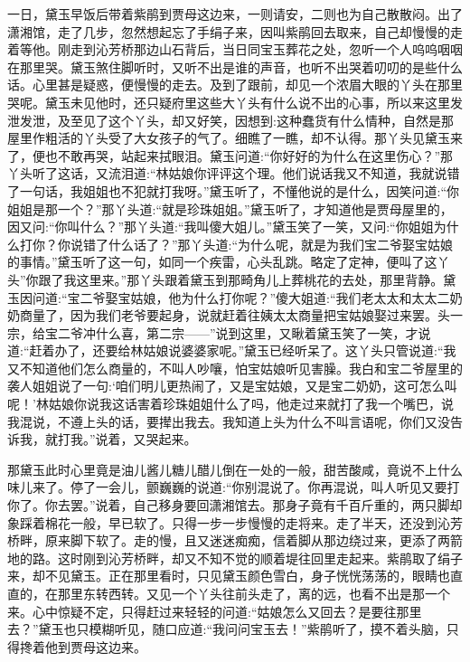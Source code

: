 \begin{parag}
    一日，黛玉早饭后带着紫鹃到贾母这边来，一则请安，二则也为自己散散闷。出了潇湘馆，走了几步，忽然想起忘了手绢子来，因叫紫鹃回去取来，自己却慢慢的走着等他。刚走到沁芳桥那边山石背后，当日同宝玉葬花之处，忽听一个人呜呜咽咽在那里哭。黛玉煞住脚听时，又听不出是谁的声音，也听不出哭着叨叨的是些什么话。心里甚是疑惑，便慢慢的走去。及到了跟前，却见一个浓眉大眼的丫头在那里哭呢。黛玉未见他时，还只疑府里这些大丫头有什么说不出的心事，所以来这里发泄发泄，及至见了这个丫头，却又好笑，因想到:这种蠢货有什么情种，自然是那屋里作粗活的丫头受了大女孩子的气了。细瞧了一瞧，却不认得。那丫头见黛玉来了，便也不敢再哭，站起来拭眼泪。黛玉问道:“你好好的为什么在这里伤心？”那丫头听了这话，又流泪道:“林姑娘你评评这个理。他们说话我又不知道，我就说错了一句话，我姐姐也不犯就打我呀。”黛玉听了，不懂他说的是什么，因笑问道:“你姐姐是那一个？”那丫头道:“就是珍珠姐姐。”黛玉听了，才知道他是贾母屋里的，因又问:“你叫什么？”那丫头道:“我叫傻大姐儿。”黛玉笑了一笑，又问:“你姐姐为什么打你？你说错了什么话了？”那丫头道:“为什么呢，就是为我们宝二爷娶宝姑娘的事情。”黛玉听了这一句，如同一个疾雷，心头乱跳。略定了定神，便叫了这丫头”你跟了我这里来。”那丫头跟着黛玉到那畸角儿上葬桃花的去处，那里背静。黛玉因问道:“宝二爷娶宝姑娘，他为什么打你呢？”傻大姐道:“我们老太太和太太二奶奶商量了，因为我们老爷要起身，说就赶着往姨太太商量把宝姑娘娶过来罢。头一宗，给宝二爷冲什么喜，第二宗——”说到这里，又瞅着黛玉笑了一笑，才说道:“赶着办了，还要给林姑娘说婆婆家呢。”黛玉已经听呆了。这丫头只管说道:“我又不知道他们怎么商量的，不叫人吵嚷，怕宝姑娘听见害臊。我白和宝二爷屋里的袭人姐姐说了一句:‘咱们明儿更热闹了，又是宝姑娘，又是宝二奶奶，这可怎么叫呢！’林姑娘你说我这话害着珍珠姐姐什么了吗，他走过来就打了我一个嘴巴，说我混说，不遵上头的话，要撵出我去。我知道上头为什么不叫言语呢，你们又没告诉我，就打我。”说着，又哭起来。
\end{parag}


\begin{parag}
    那黛玉此时心里竟是油儿酱儿糖儿醋儿倒在一处的一般，甜苦酸咸，竟说不上什么味儿来了。停了一会儿，颤巍巍的说道:“你别混说了。你再混说，叫人听见又要打你了。你去罢。”说着，自己移身要回潇湘馆去。那身子竟有千百斤重的，两只脚却象踩着棉花一般，早已软了。只得一步一步慢慢的走将来。走了半天，还没到沁芳桥畔，原来脚下软了。走的慢，且又迷迷痴痴，信着脚从那边绕过来，更添了两箭地的路。这时刚到沁芳桥畔，却又不知不觉的顺着堤往回里走起来。紫鹃取了绢子来，却不见黛玉。正在那里看时，只见黛玉颜色雪白，身子恍恍荡荡的，眼睛也直直的，在那里东转西转。又见一个丫头往前头走了，离的远，也看不出是那一个来。心中惊疑不定，只得赶过来轻轻的问道:“姑娘怎么又回去？是要往那里去？”黛玉也只模糊听见，随口应道:“我问问宝玉去！”紫鹃听了，摸不着头脑，只得搀着他到贾母这边来。
\end{parag}


